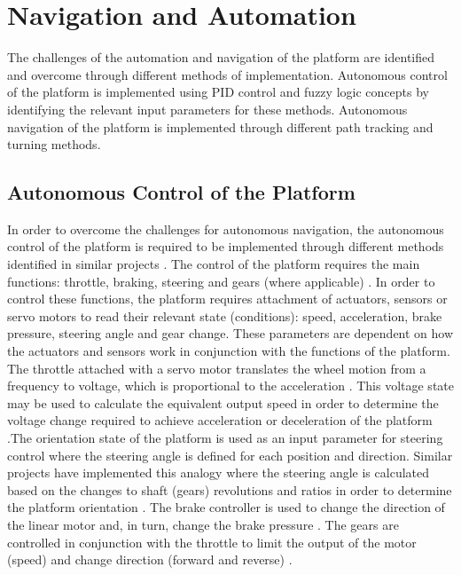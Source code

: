 \documentclass[main.tex]{subfiles}
\begin{document}
\section{Navigation and Automation}
The challenges of the automation and navigation of the platform are identified and overcome through different methods of implementation. Autonomous control of the platform is implemented using PID control and fuzzy logic concepts by identifying the relevant input parameters for these methods. Autonomous navigation of the platform is implemented through different path tracking and turning methods.  

\subsection{Autonomous Control of the Platform}
In order to overcome the challenges for autonomous navigation, the autonomous control of the platform is required to be implemented through different methods identified in similar projects \parencite{zhao2012design,scheiner2011}. The control of the platform requires the main functions: throttle, braking, steering and gears (where applicable) \parencite{zhao2012design}. In order to control these functions, the platform requires attachment of actuators, sensors or servo motors to read their relevant state (conditions): speed, acceleration, brake pressure, steering angle and gear change. These parameters are dependent on how the actuators and sensors work in conjunction with the functions of the platform. The throttle attached with a servo motor translates the wheel motion from a frequency to voltage, which is proportional to the acceleration \parencite{zhao2012design,scheiner2011}. This voltage state may be used to calculate the equivalent output speed in order to determine the voltage change required to achieve acceleration or deceleration of the platform \parencite{scheiner2011}.The orientation state of the platform is used as an input parameter for steering control where the steering angle is defined for each position and direction. Similar projects have implemented this analogy where the steering angle is calculated based on the changes to shaft (gears) revolutions and ratios in order to determine the platform orientation \parencite{zhang2010study,zhao2012design}. The brake controller is used to change the direction of the linear motor and, in turn, change the brake pressure \parencite{zhao2012design}. The gears are controlled in conjunction with the throttle to limit the output of the motor (speed) and change direction (forward and reverse) \parencite{tran2007modelling}.
\end{document}
